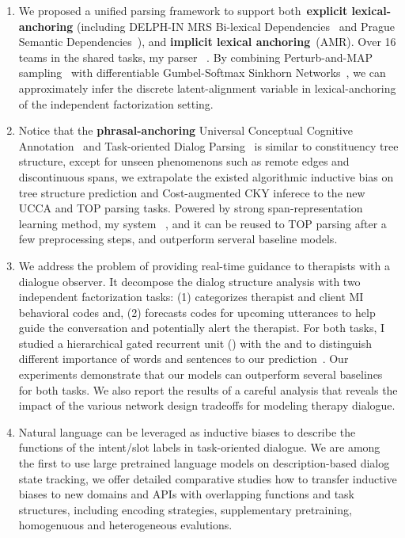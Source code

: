\begin{enumerate}
\item We proposed a unified parsing framework to support
  both~\textbf{explicit lexical-anchoring} (including DELPH-IN MRS Bi-lexical
  Dependencies~\citep[DM,][]{ivanova2012did} and Prague Semantic
  Dependencies~\citep[PSD,][]{hajic2012announcing,miyao2014house}),
  and \textbf{implicit lexical anchoring}~(AMR). Over 16 teams in the
  shared tasks, my parser~\citep{cao2019amazon} . By combining Perturb-and-MAP
  sampling~\citep{papandreouperturb} with differentiable
  Gumbel-Softmax Sinkhorn Networks~\citep{mena2018learning}, we can
  approximately infer the discrete latent-alignment variable in
  lexical-anchoring of the independent factorization setting.

\item Notice that the \textbf{phrasal-anchoring} Universal Conceptual
  Cognitive Annotation~\citep[UCCA,][]{abend2013universal} and
  Task-oriented Dialog
  Parsing~\citep[TOP,][]{gupta-etal-2018-semantic-parsing} is similar
  to constituency tree structure, except for unseen phenomenons such
  as remote edges and discontinuous spans, we extrapolate the existed
  algorithmic inductive bias on tree structure prediction and
  Cost-augmented CKY inferece to the new UCCA and TOP parsing
  tasks. Powered by strong span-representation learning method, my
  system~\citep{cao2019amazon} ,
  and it can be reused to TOP parsing after a few preprocessing steps,
  and outperform serveral baseline models.

\item We address the problem of providing real-time guidance to
  therapists with a dialogue observer. It decompose the dialog
  structure analysis with two independent factorization tasks: (1)
  categorizes therapist and client MI behavioral codes and, (2)
  forecasts codes for upcoming utterances to help guide the
  conversation and potentially alert the therapist. For both tasks, I
  studied a hierarchical gated recurrent unit (\HGRU) with the
   and  to
  distinguish different importance of words and sentences to our
  prediction~\citep{jie2019psycdialacl}. Our experiments demonstrate
  that our models can outperform several baselines for both tasks.  We
  also report the results of a careful analysis that reveals the
  impact of the various network design tradeoffs for modeling therapy
  dialogue.

\item Natural language can be leveraged as inductive biases to
  describe the functions of the intent/slot labels in task-oriented
  dialogue. We are among the first to use large pretrained language
  models on description-based dialog state tracking, we offer detailed
  comparative studies how to transfer inductive biases to new domains
  and APIs with overlapping functions and task structures, including
  encoding strategies, supplementary pretraining, homogenuous and
  heterogeneous evalutions.
\end{enumerate}


